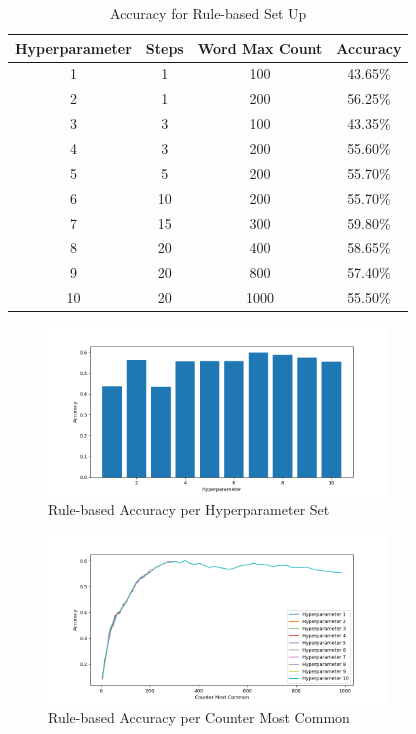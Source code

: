 \begin{table}[H]
\begin{center}
\begin{tabular}{||c|c|c|c||}
    \hline
    Hyperparameter & Steps & Word Max Count & Accuracy \\
    \hline
    1 & 1 & 100 & 43.65\% \\
    2 & 1 & 200 & 56.25\% \\
    3 & 3 & 100 & 43.35\% \\
    4 & 3 & 200 & 55.60\% \\
    5 & 5 & 200 & 55.70\% \\
    6 & 10 & 200 & 55.70\% \\
    7 & 15 & 300 & 59.80\% \\
    8 & 20 & 400 & 58.65\% \\
    9 & 20 & 800 & 57.40\% \\
    10 & 20 & 1000 & 55.50\% \\
    \hline
\end{tabular}
\caption[Rule-based Results]{Accuracy for Rule-based Set Up}
\label{tab:rule-results}
\end{center}
\end{table}

\begin{figure}[H]
    \centering
    \includegraphics*[width=0.8\textwidth]{images/acc-bar-rules.png}
    \caption{Rule-based Accuracy per Hyperparameter Set}
    \label{fig:rule-results}
\end{figure}

\begin{figure}[H]
    \centering
    \includegraphics*[width=0.8\textwidth]{images/acc-rules.png}
    \caption{Rule-based Accuracy per Counter Most Common}
    \label{fig:rule-results-2}
\end{figure}

